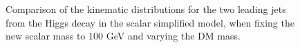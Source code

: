 \begin{figure}[hbpt!]
	\hfill
	\caption{Comparison of the kinematic distributions for the two leading jets from the Higgs decay in the scalar simplified model, 
		when fixing the new scalar mass to 100 GeV and varying the DM mass. 
		\label{fig:ScalarHbb}}
\end{figure}

